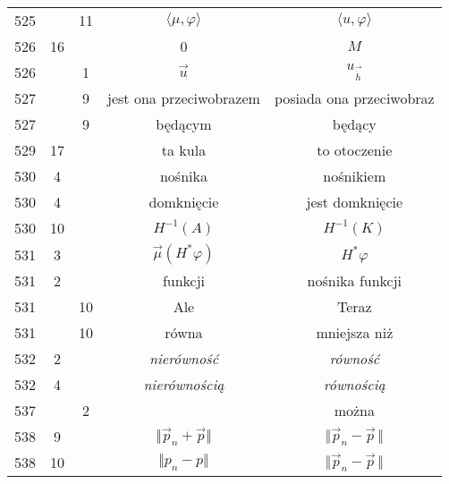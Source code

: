\documentclass[a4paper,11pt]{article}
\begin{document}
\begin{center}
\begin{tabular}{|c|c|c|c|c|}
    525 & & 11 & $\langle \mu, \varphi \rangle$
           & $\langle u, \varphi \rangle$ \\
    526 & 16 & & 0 & $M$ \\
    526 & &  1 & $\overrightarrow{ u }_{ \dot{ } }$
           & $u_{ \overrightarrow{ \dot{ h } } }$ \\
    527 & &  9 & jest ona przeciwobrazem & posiada ona przeciwobraz \\
    527 & &  9 & będącym & będący \\
    529 & 17 & & ta kula & to otoczenie \\
    530 &  4 & & nośnika & nośnikiem \\
    530 &  4 & & domknięcie & jest domknięcie \\
    530 & 10 & & $H^{ -1 }( A )$ & $H^{ -1 }( K )$ \\
    531 &  3 & & $\vec{ \mu }( H^{ * } \varphi )$ & $H^{ * } \varphi$ \\
    531 &  2 & & funkcji & nośnika funkcji \\
    531 & & 10 & Ale & Teraz \\
    531 & & 10 & równa & mniejsza niż \\
    532 &  2 & & \textit{nierówność} & \textit{równość} \\
    532 &  4 & & \textit{nierównością} & \textit{równością} \\
    537 & &  2 & & można \\
    538 &  9 & & $\Vert \vec{ p }_{ n } + \vec{ p } \Vert$
           & $\Vert \vec{ p }_{ n } - \vec{ p }\, \Vert$ \\
    538 & 10 & & $\Vert p_{ n } - p \Vert$
           & $\Vert \vec{ p }_{ n } - \vec{ p }\, \Vert$ \\
    \hline
  \end{tabular}

\end{center}
\end{document}
